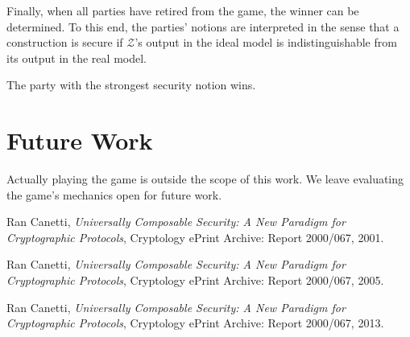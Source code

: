 \documentclass{llncs}
\begin{document}
Finally, when all parties have retired from the game, the winner can be determined. To this end, the parties' notions are interpreted in the sense that a construction is secure if $\mathcal{Z}$'s output in the ideal model is indistinguishable from its output in the real model.

\begin{theorem}
	The party with the strongest security notion wins.
\end{theorem}

\section{Future Work}
Actually playing the game is outside the scope of this work.
We leave evaluating the game's mechanics open for future work.

\begin{thebibliography}{9}
  Ran Canetti,
  \emph{Universally Composable Security: A New Paradigm for Cryptographic Protocols},
  Cryptology ePrint Archive: Report 2000/067,
  2001.

  Ran Canetti,
  \emph{Universally Composable Security: A New Paradigm for Cryptographic Protocols},
  Cryptology ePrint Archive: Report 2000/067,
  2005.

  Ran Canetti,
  \emph{Universally Composable Security: A New Paradigm for Cryptographic Protocols},
  Cryptology ePrint Archive: Report 2000/067,
  2013.
\end{thebibliography}
\end{document}
